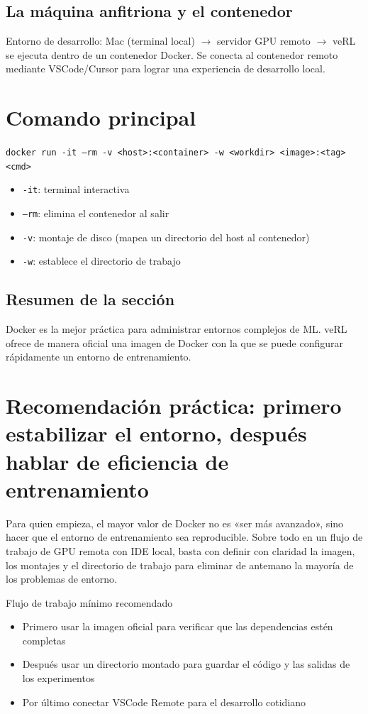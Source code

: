 \documentclass[a4paper]{article}
\begin{document}
\subsection{La máquina anfitriona y el contenedor}
Entorno de desarrollo: Mac (terminal local) $\to$ servidor GPU remoto $\to$ veRL se ejecuta dentro de un contenedor Docker. Se conecta al contenedor remoto mediante VSCode/Cursor para lograr una experiencia de desarrollo local.

\section{Comando principal}
\texttt{docker run -it --rm -v <host>:<container> -w <workdir> <image>:<tag> <cmd>}
\begin{itemize}
  \item \texttt{-it}: terminal interactiva
  \item \texttt{--rm}: elimina el contenedor al salir
  \item \texttt{-v}: montaje de disco (mapea un directorio del host al contenedor)
  \item \texttt{-w}: establece el directorio de trabajo
\end{itemize}

\subsection{Resumen de la sección}
Docker es la mejor práctica para administrar entornos complejos de ML. veRL ofrece de manera oficial una imagen de Docker con la que se puede configurar rápidamente un entorno de entrenamiento.

\newpage
\section{Recomendación práctica: primero estabilizar el entorno, después hablar de eficiencia de entrenamiento}
Para quien empieza, el mayor valor de Docker no es «ser más avanzado», sino hacer que el entorno de entrenamiento sea reproducible. Sobre todo en un flujo de trabajo de GPU remota con IDE local, basta con definir con claridad la imagen, los montajes y el directorio de trabajo para eliminar de antemano la mayoría de los problemas de entorno.

\begin{knowledgebox}{Flujo de trabajo mínimo recomendado}
\begin{itemize}
  \item Primero usar la imagen oficial para verificar que las dependencias estén completas
  \item Después usar un directorio montado para guardar el código y las salidas de los experimentos
  \item Por último conectar VSCode Remote para el desarrollo cotidiano
\end{itemize}
\end{knowledgebox}
\end{document}
